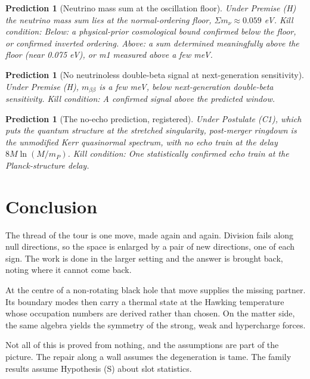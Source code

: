 \documentclass[11pt]{article}
\newtheorem{prediction}[theorem]{Prediction}
\theoremstyle{definition}
\theoremstyle{plain}
\providecommand{\mnu}{}\renewcommand{\mnu}{\Sigma m_{\nu}}
\begin{document}
\begin{prediction}[Neutrino mass sum at the oscillation floor]\label{c:pred.neutrino-mass-sum-floor}
Under Premise (H) the neutrino mass sum lies at the normal-ordering floor, $\mnu \approx 0.059$ eV.
\emph{Kill condition:} Below: a physical-prior cosmological bound confirmed below the floor, or confirmed inverted ordering. Above: a sum determined meaningfully above the floor (near 0.075 eV), or m1 measured above a few meV.
\end{prediction}

\begin{prediction}[No neutrinoless double-beta signal at next-generation sensitivity]\label{c:pred.no-neutrinoless-double-beta}
Under Premise (H), $m_{\beta\beta}$ is a few meV, below next-generation double-beta sensitivity.
\emph{Kill condition:} A confirmed signal above the predicted window.
\end{prediction}

\begin{prediction}[The no-echo prediction, registered]\label{c:scrambling.no-echo-prediction-registered}
Under Postulate (C1), which puts the quantum structure at the stretched singularity, post-merger ringdown is the unmodified Kerr quasinormal spectrum, with no echo train at the delay $8M\ln(M/m_P)$.
\emph{Kill condition:} One statistically confirmed echo train at the Planck-structure delay.
\end{prediction}

\section*{Conclusion}
The thread of the tour is one move, made again and again. Division fails along null directions, so the space is enlarged by a pair of new directions, one of each sign. The work is done in the larger setting and the answer is brought back, noting where it cannot come back.

At the centre of a non-rotating black hole that move supplies the missing partner. Its boundary modes then carry a thermal state at the Hawking temperature whose occupation numbers are derived rather than chosen. On the matter side, the same algebra yields the symmetry of the strong, weak and hypercharge forces.

Not all of this is proved from nothing, and the assumptions are part of the picture. The repair along a wall assumes the degeneration is tame. The family results assume Hypothesis (S) about slot statistics.
\end{document}
